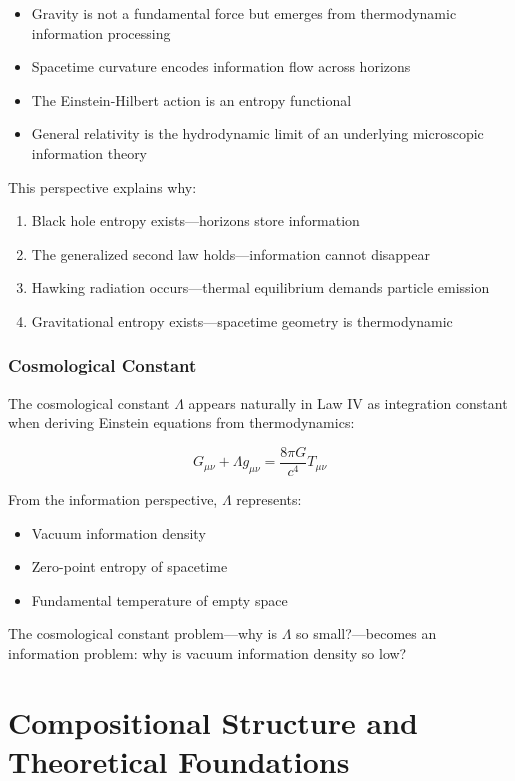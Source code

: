 \documentclass[11pt,a4paper]{article}
\theoremstyle{plain}
\theoremstyle{definition}
\theoremstyle{remark}
\begin{document}
\begin{itemize}[leftmargin=*]
\item Gravity is not a fundamental force but emerges from thermodynamic information processing
\item Spacetime curvature encodes information flow across horizons
\item The Einstein-Hilbert action is an entropy functional
\item General relativity is the hydrodynamic limit of an underlying microscopic information theory
\end{itemize}

This perspective explains why:
\begin{enumerate}[leftmargin=*]
\item Black hole entropy exists—horizons store information
\item The generalized second law holds—information cannot disappear
\item Hawking radiation occurs—thermal equilibrium demands particle emission
\item Gravitational entropy exists—spacetime geometry is thermodynamic
\end{enumerate}

\subsubsection{Cosmological Constant}

The cosmological constant $\Lambda$ appears naturally in Law IV as integration constant when deriving Einstein equations from thermodynamics:

\begin{equation}
G_{\mu\nu} + \Lambda g_{\mu\nu} = \frac{8\pi G}{c^4}T_{\mu\nu}
\end{equation}

From the information perspective, $\Lambda$ represents:
\begin{itemize}[leftmargin=*]
\item Vacuum information density
\item Zero-point entropy of spacetime
\item Fundamental temperature of empty space
\end{itemize}

The cosmological constant problem—why is $\Lambda$ so small?—becomes an information problem: why is vacuum information density so low?

\section{Compositional Structure and Theoretical Foundations}
\label{sec:derivations}
\end{document}
